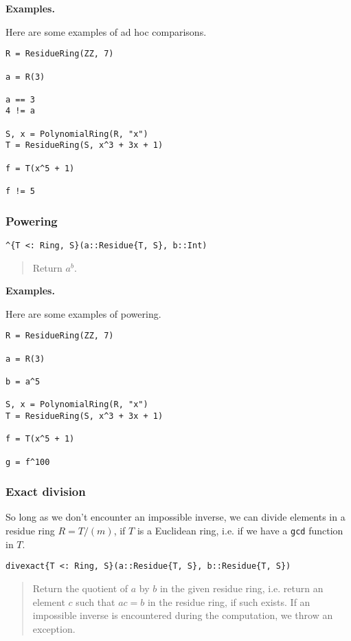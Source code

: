 \documentclass[a4paper,10pt]{article}
\newcommand{\code}{\lstinline}
\newcommand{\desc}[1]{\vspace{-3mm}\begin{quote}#1\end{quote}}
\begin{document}
{{{\textbf{Examples.}

Here are some examples of ad hoc comparisons.

\begin{lstlisting}
R = ResidueRing(ZZ, 7)

a = R(3)

a == 3
4 != a

S, x = PolynomialRing(R, "x")
T = ResidueRing(S, x^3 + 3x + 1)

f = T(x^5 + 1)

f != 5
\end{lstlisting}

\subsubsection{Powering}

\begin{lstlisting}
^{T <: Ring, S}(a::Residue{T, S}, b::Int)
\end{lstlisting}

\desc{Return $a^b$.}

\textbf{Examples.}

Here are some examples of powering.

\begin{lstlisting}
R = ResidueRing(ZZ, 7)

a = R(3)

b = a^5

S, x = PolynomialRing(R, "x")
T = ResidueRing(S, x^3 + 3x + 1)

f = T(x^5 + 1)

g = f^100
\end{lstlisting}

\subsubsection{Exact division}

So long as we don't encounter an impossible inverse, we can
divide elements in a residue ring $R = T/(m)$, if $T$ is a
Euclidean ring, i.e. if we have a \code{gcd} function in $T$.

\begin{lstlisting}
divexact{T <: Ring, S}(a::Residue{T, S}, b::Residue{T, S})
\end{lstlisting}

\desc{Return the quotient of $a$ by $b$ in the given residue
ring, i.e. return an element $c$ such that $ac = b$ in the residue ring,
if such exists. If an impossible inverse is encountered during the
computation, we throw an exception.}

}}}
\end{document}
